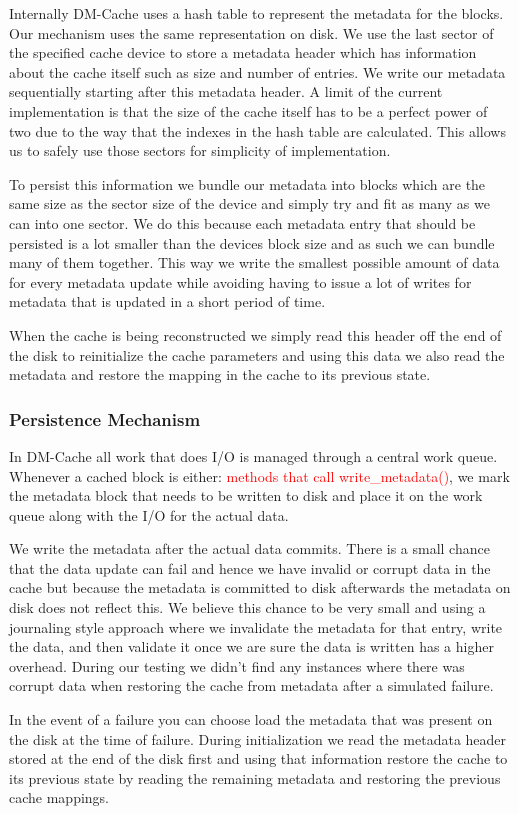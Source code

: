 Internally DM-Cache uses a hash table to represent the metadata for
the blocks. Our mechanism uses the same representation on disk. We use
the last sector of the specified cache device to store a metadata
header which has information about the cache itself such as size and
number of entries. We write our metadata sequentially starting after
this metadata header. A limit of the current implementation is that
the size of the cache itself has to be a perfect power of two due to
the way that the indexes in the hash table are calculated. This allows
us to safely use those sectors for simplicity of implementation.

To persist this information we bundle our metadata into blocks which
are the same size as the sector size of the device and simply try and
fit as many as we can into one sector. We do this because each
metadata entry that should be persisted is a lot smaller than the
devices block size and as such we can bundle many of them
together. This way we write the smallest possible amount of data for
every metadata update while avoiding having to issue a lot of writes
for metadata that is updated in a short period of time.

When the cache is being reconstructed we simply read this header off
the end of the disk to reinitialize the cache parameters and using
this data we also read the metadata and restore the mapping in the
cache to its previous state.

\subsubsection{Persistence Mechanism}

In DM-Cache all work that does I/O is managed through a central work
queue. Whenever a cached block is either: \textcolor{red}{methods that
  call write\_metadata()}, we mark the metadata block that needs to be
written to disk and place it on the work queue along with the I/O for
the actual data.

We write the metadata after the actual data commits. There is a small
chance that the data update can fail and hence we have invalid or
corrupt data in the cache but because the metadata is committed to
disk afterwards the metadata on disk does not reflect this. We believe
this chance to be very small and using a journaling style approach
where we invalidate the metadata for that entry, write the data, and
then validate it once we are sure the data is written has a higher
overhead. During our testing we didn't find any instances where there
was corrupt data when restoring the cache from metadata after a
simulated failure.

In the event of a failure you can choose load the metadata that was
present on the disk at the time of failure. During initialization we
read the metadata header stored at the end of the disk first and using
that information restore the cache to its previous state by reading
the remaining metadata and restoring the previous cache mappings.
